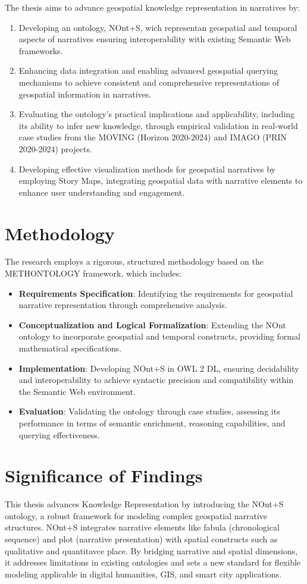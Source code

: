 The thesis aims to advance geospatial knowledge representation in narratives by:
\begin{enumerate}
    \item Developing an ontology, NOnt+S, wich representan geospatial and temporal aspects of narratives ensuring interoperability with existing Semantic Web frameworks.
    \item Enhancing data integration and enabling advanced geospatial querying mechanisms to achieve consistent and comprehensive representations of geospatial information in narratives.
    \item Evaluating the ontology's practical implications and applicability, including its ability to infer new knowledge, through empirical validation in real-world case studies from the MOVING (Horizon 2020-2024) and IMAGO (PRIN 2020-2024) projects.
    \item Developing effective visualization methods for geospatial narratives by employing Story Maps, integrating geospatial data with narrative elements to enhance user understanding and engagement.
\end{enumerate}

\section*{Methodology}

The research employs a rigorous, structured methodology based on the METHONTOLOGY framework, which includes:
\begin{itemize}
    \item \textbf{Requirements Specification}: Identifying the requirements for geospatial narrative representation through comprehensive analysis.
    \item \textbf{Conceptualization and Logical Formalization}: Extending the NOnt ontology to incorporate geospatial and temporal constructs, providing formal mathematical specifications.
    \item \textbf{Implementation}: Developing NOnt+S in OWL 2 DL, ensuring decidability and interoperability to achieve syntactic precision and compatibility within the Semantic Web environment.
    \item \textbf{Evaluation}: Validating the ontology through case studies, assessing its performance in terms of semantic enrichment, reasoning capabilities, and querying effectiveness.
\end{itemize}

\section*{Significance of Findings}
This thesis advances Knowledge Representation by introducing the NOnt+S ontology, a robust framework for modeling complex geospatial narrative structures. NOnt+S integrates narrative elements like fabula (chronological sequence) and plot (narrative presentation) with spatial constructs such as qualitative and quantitavce place. By bridging narrative and spatial dimensions, it addresses limitations in existing ontologies and sets a new standard for flexible modeling applicable in digital humanities, GIS, and smart city applications.

